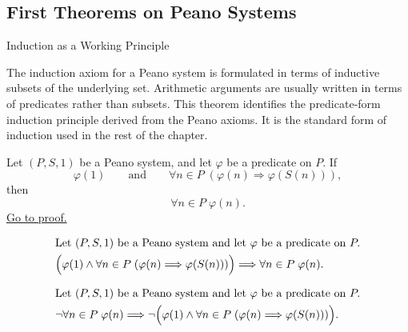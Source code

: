 \subsection{First Theorems on Peano Systems}

\begin{topicbox}{Induction as a Working Principle}
\begin{exposition}
The induction axiom for a Peano system is formulated in terms of inductive
subsets of the underlying set. Arithmetic arguments are usually written in
terms of predicates rather than subsets. This theorem identifies the
predicate-form induction principle derived from the Peano axioms. It is the
standard form of induction used in the rest of the chapter.
\end{exposition}

\begin{tcolorbox}[colback=thmbox, colframe=thmborder, arc=2pt,
  left=6pt, right=6pt, top=4pt, bottom=4pt,
  title={\small\textbf{Theorem (Induction Principle for a Peano System)}},
  fonttitle=\small\bfseries]
\begin{theorem}
\label{thm:induction-principle-for-peano-system}
Let $(P,S,1)$ be a Peano system, and let $\varphi$ be a predicate on $P$.
If
\[
\varphi(1)
\qquad\text{and}\qquad
\forall n \in P\;(\varphi(n) \Longrightarrow \varphi(S(n))),
\]
then
\[
\forall n \in P\;\varphi(n).
\]
\hyperref[prf:induction-principle-for-peano-system]{Go to proof.}
\end{theorem}
\end{tcolorbox}

\begin{remark*}
\[
\begin{aligned}
&\text{Let } (P,S,1) \text{ be a Peano system and let } \varphi
\text{ be a predicate on } P.\\
&\Bigl(\varphi(1) \land
\forall n \in P\;(\varphi(n) \Longrightarrow \varphi(S(n)))\Bigr)
\Longrightarrow
\forall n \in P\;\varphi(n).
\end{aligned}
\]
\end{remark*}

\begin{remark*}
\[
\begin{aligned}
&\text{Let } (P,S,1) \text{ be a Peano system and let } \varphi
\text{ be a predicate on } P.\\
&\neg\forall n \in P\;\varphi(n)
\Longrightarrow
\neg\Bigl(\varphi(1) \land
\forall n \in P\;(\varphi(n) \Longrightarrow \varphi(S(n)))\Bigr).
\end{aligned}
\]
\end{remark*}


\end{topicbox}
